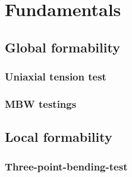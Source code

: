 \section{Fundamentals}\label{ch:intro:se:fund}







\subsection{Global formability}
\subsubsection{Uniaxial tension test}
\subsubsection{MBW testings}


\subsection{Local formability}
\subsubsection{Three-point-bending-test}
